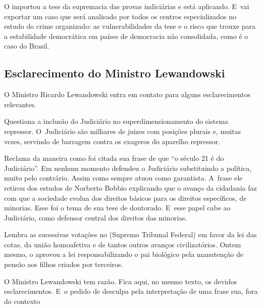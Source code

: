 O  importou a tese da supremacia das provas indiciárias e está
aplicando. E~vai exportar um caso que será analisado por todos os
centros especializados no estudo do crime organizado: as
vulnerabilidades da tese e o risco que trouxe para a estabilidade
democrática em países de democracia não consolidada, como é o caso do
Brasil.

\subsection{Esclarecimento do Ministro Lewandowski}

 

O Ministro Ricardo Lewandowski entra em contato para alguns
esclarecimentos relevantes.

 

Questiona a inclusão do Judiciário no superdimensionamento do sistema
repressor. O~Judiciário são milhares de juizes com posições plurais e,
muitas vezes, servindo de barragem contra os exageros do aparelho
repressor.

 

Reclama da maneira como foi citada sua frase de que ``o século 21 é do
Judiciário''. Em nenhum momento defendeu o Judiciário substituindo a
política, muito pelo contrário. Assim como sempre atuou como garantista.
A~frase ele retirou dos estudos de Norberto Bobbio explicando que o
avanço da cidadania faz com que a sociedade evolua dos direitos básicos
para os direitos específicos, de minorias. Esse foi o tema de sua tese
de doutorado. E~esse papel cabe ao Judiciário, como defensor central dos
direitos das minorias.

 

Lembra as sucessivas votações no  (Supremo Tribunal Federal) em favor
da lei das cotas, da união homoafetiva e de tantos outros avanços
civilizatórios. Ontem mesmo, o  aprovou a lei responsabilizando o pai
biológico pela manutenção de pensão aos filhos criados por terceiros.

 

O Ministro Lewandowski tem razão. Fica aqui, no mesmo texto, os devidos
esclarecimentos. E~o pedido de desculpa pela interpretação de uma frase
sua, fora do contexto
